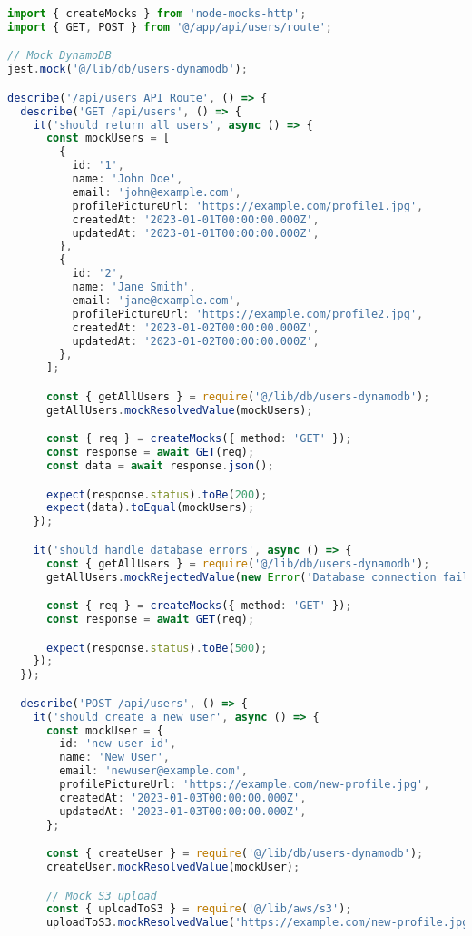 \begin{lstlisting}[language=TypeScript, caption=Tests d'intégration API]
import { createMocks } from 'node-mocks-http';
import { GET, POST } from '@/app/api/users/route';

// Mock DynamoDB
jest.mock('@/lib/db/users-dynamodb');

describe('/api/users API Route', () => {
  describe('GET /api/users', () => {
    it('should return all users', async () => {
      const mockUsers = [
        {
          id: '1',
          name: 'John Doe',
          email: 'john@example.com',
          profilePictureUrl: 'https://example.com/profile1.jpg',
          createdAt: '2023-01-01T00:00:00.000Z',
          updatedAt: '2023-01-01T00:00:00.000Z',
        },
        {
          id: '2',
          name: 'Jane Smith',
          email: 'jane@example.com',
          profilePictureUrl: 'https://example.com/profile2.jpg',
          createdAt: '2023-01-02T00:00:00.000Z',
          updatedAt: '2023-01-02T00:00:00.000Z',
        },
      ];

      const { getAllUsers } = require('@/lib/db/users-dynamodb');
      getAllUsers.mockResolvedValue(mockUsers);

      const { req } = createMocks({ method: 'GET' });
      const response = await GET(req);
      const data = await response.json();

      expect(response.status).toBe(200);
      expect(data).toEqual(mockUsers);
    });

    it('should handle database errors', async () => {
      const { getAllUsers } = require('@/lib/db/users-dynamodb');
      getAllUsers.mockRejectedValue(new Error('Database connection failed'));

      const { req } = createMocks({ method: 'GET' });
      const response = await GET(req);

      expect(response.status).toBe(500);
    });
  });

  describe('POST /api/users', () => {
    it('should create a new user', async () => {
      const mockUser = {
        id: 'new-user-id',
        name: 'New User',
        email: 'newuser@example.com',
        profilePictureUrl: 'https://example.com/new-profile.jpg',
        createdAt: '2023-01-03T00:00:00.000Z',
        updatedAt: '2023-01-03T00:00:00.000Z',
      };

      const { createUser } = require('@/lib/db/users-dynamodb');
      createUser.mockResolvedValue(mockUser);

      // Mock S3 upload
      const { uploadToS3 } = require('@/lib/aws/s3');
      uploadToS3.mockResolvedValue('https://example.com/new-profile.jpg');


\end{lstlisting}
